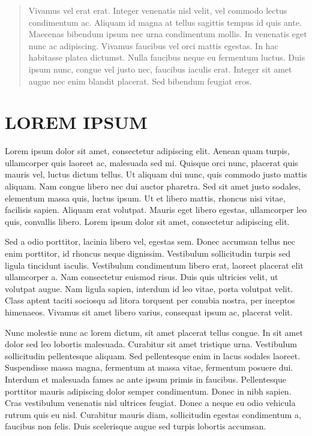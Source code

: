 \documentclass[doutorado,rascunho]{fei}
\begin{document}
\begin{abstract}
Vivamus vel erat erat. Integer venenatis nisl velit, vel commodo lectus condimentum ac. Aliquam id magna at tellus sagittis tempus id quis ante. Maecenas bibendum ipsum nec urna condimentum mollis. In venenatis eget nunc ac adipiscing. Vivamus faucibus vel orci mattis egestas. In hac habitasse platea dictumst. Nulla faucibus neque eu fermentum luctus. Duis ipsum nunc, congue vel justo nec, faucibus iaculis erat. Integer sit amet augue nec enim blandit placerat. Sed bibendum feugiat eros.
\end{abstract}

\listoffigures
\listoftables
\listofalgorithms
\glsaddall
\printglossaries
\tableofcontents

\chapter{LOREM IPSUM}

Lorem ipsum dolor sit amet, consectetur adipiscing elit. Aenean quam turpis, ullamcorper quis laoreet ac, malesuada sed mi. Quisque orci nunc, placerat quis mauris vel, luctus dictum tellus. Ut aliquam dui nunc, quis commodo justo mattis aliquam. Nam congue libero nec dui auctor pharetra. Sed sit amet justo sodales, elementum massa quis, luctus ipsum. Ut et libero mattis, rhoncus nisi vitae, facilisis sapien. Aliquam erat volutpat. Mauris eget libero egestas, ullamcorper leo quis, convallis libero. Lorem ipsum dolor sit amet, consectetur adipiscing elit.

Sed a odio porttitor, lacinia libero vel, egestas sem. Donec accumsan tellus nec enim porttitor, id rhoncus neque dignissim. Vestibulum sollicitudin turpis sed ligula tincidunt iaculis. Vestibulum condimentum libero erat, laoreet placerat elit ullamcorper a. Nam consectetur euismod risus. Duis quis ultricies velit, ut volutpat augue. Nam ligula sapien, interdum id leo vitae, porta volutpat velit. Class aptent taciti sociosqu ad litora torquent per conubia nostra, per inceptos himenaeos. Vivamus sit amet libero varius, consequat ipsum ac, placerat velit.

Nunc molestie nunc ac lorem dictum, sit amet placerat tellus congue. In sit amet dolor sed leo lobortis malesuada. Curabitur sit amet tristique urna. Vestibulum sollicitudin pellentesque aliquam. Sed pellentesque enim in lacus sodales laoreet. Suspendisse massa magna, fermentum at massa vitae, fermentum posuere dui. Interdum et malesuada fames ac ante ipsum primis in faucibus. Pellentesque porttitor mauris adipiscing dolor semper condimentum. Donec in nibh sapien. Cras vestibulum venenatis nisl ultrices feugiat. Donec a neque eu odio vehicula rutrum quis eu nisl. Curabitur mauris diam, sollicitudin egestas condimentum a, faucibus non felis. Duis scelerisque augue sed turpis lobortis accumsan.
\end{document}
